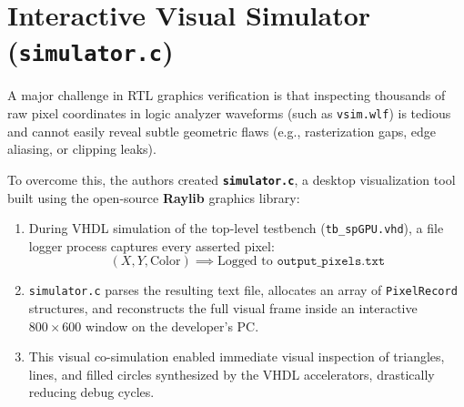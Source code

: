 \section{Interactive Visual Simulator (\texttt{simulator.c})}
A major challenge in RTL graphics verification is that inspecting thousands of raw pixel coordinates in logic analyzer waveforms (such as \texttt{vsim.wlf}) is tedious and cannot easily reveal subtle geometric flaws (e.g., rasterization gaps, edge aliasing, or clipping leaks).

To overcome this, the authors created \textbf{\texttt{simulator.c}}, a desktop visualization tool built using the open-source \textbf{Raylib} graphics library:
\begin{enumerate}
    \item During VHDL simulation of the top-level testbench (\texttt{tb\_spGPU.vhd}), a file logger process captures every asserted pixel:
    \begin{equation}
    (X, Y, \text{Color}) \implies \text{Logged to } \texttt{output\_pixels.txt}
    \end{equation}
    \item \texttt{simulator.c} parses the resulting text file, allocates an array of \texttt{PixelRecord} structures, and reconstructs the full visual frame inside an interactive $800 \times 600$ window on the developer's PC.
    \item This visual co-simulation enabled immediate visual inspection of triangles, lines, and filled circles synthesized by the VHDL accelerators, drastically reducing debug cycles.
\end{enumerate}

